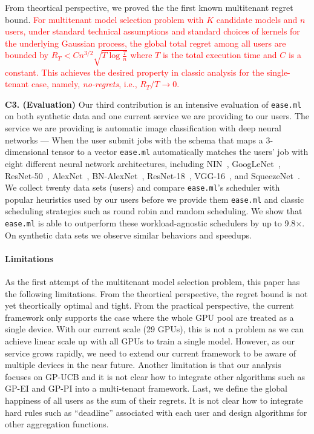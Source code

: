 \documentclass[letterpaper]{vldb}
\newcommand{\eml}{\texttt{ease.ml}\xspace}
\begin{document}
From theortical perspective, we proved the
the first known multitenant regret bound. 
\textcolor{red}{For multitenant model selection problem 
with $K$ candidate models and $n$ users,
under standard technical assumptions and standard choices of
kernels for the underlying Gaussian process,
the global total regret among all
users are bounded by 
$
R_T < C n^{3/2}\sqrt{T\log \frac{T}{n}}
$
where $T$ is the total execution time
and $C$ is a constant. This achieves
the desired property in classic analysis for
the single-tenant case, namely, {\em no-regrets}, 
i.e., $R_T/T \rightarrow 0$.
}

\vspace{-0.5em}
\noindent
{\bf C3. (Evaluation)} Our third contribution is an intensive
evaluation of \eml on both synthetic data and one current
service we are providing to our users. The service 
we are providing is automatic image classification 
with deep neural networks ---  When
the user submit jobs with the schema
that maps a 3-dimensional tensor to
a vector \eml automatically matches the users' job with eight
different neural network architectures, including
NIN~\cite{XXX}, GoogLeNet~\cite{XXX}, ResNet-50~\cite{XXX}, AlexNet~\cite{XXX},
BN-AlexNet~\cite{XXX}, ResNet-18~\cite{XXX}, VGG-16~\cite{XXX},
and SqueezeNet~\cite{XXX}. We collect twenty 
data sets (users) and compare
\eml's scheduler with popular heuristics 
used by our users before we provide them
\eml and classic scheduling strategies such
as round robin and random scheduling. We show that
\eml is able to outperform
these workload-agnostic schedulers
by up to 9.8$\times$. On synthetic data sets
we observe similar behaviors and speedups.

\vspace{-1em}
\paragraph*{Limitations}
As the first attempt
of the multitenant model selection problem,
this paper has the following limitations.
From the theortical perspective, the regret bound
is not yet theortically optimal and tight.
From the practical perspective,
the current framework only supports the case where
the whole GPU pool are treated as a single device.
With our current scale (29 GPUs), this is not
a problem as we can achieve linear scale up
with all GPUs to train a single model. However, as our service grows
rapidly, we need to extend our current framework
to be aware of multiple devices in the near future.
Another limitation is that our
analysis focuses on GP-UCB and it is not clear
how to integrate other algorithms such as
GP-EI and GP-PI into a multi-tenant 
framework. Last, we define the global
happiness of all users as the sum 
of their regrets. It is not clear how to
integrate hard rules such as ``deadline''
associated with each user and design
algorithms for other aggregation functions.
\end{document}
